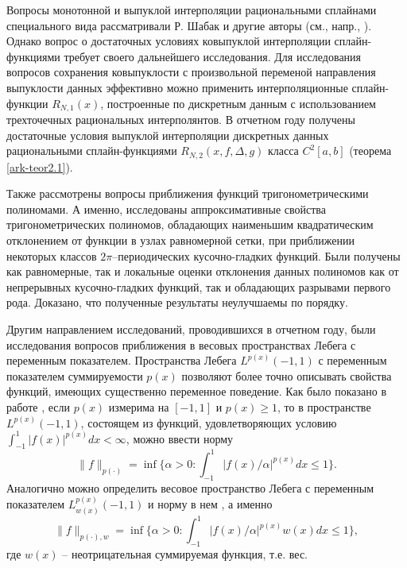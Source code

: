 Вопросы монотонной и выпуклой интерполяции рациональными сплайнами
специального вида рассматривали Р. Шабак \cite{ark-8} и другие авторы (см., напр.,
\cite{ark-9, ark-10, ark-11}).
%
Однако вопрос о достаточных условиях ковыпуклой интерполяции сплайн-функциями
требует своего дальнейшего исследования. Для исследования вопросов сохранения ковыпуклости
с произвольной переменой направления выпуклости данных эффективно можно применить
интерполяционные сплайн-функции $R_{N,1}(x)$, построенные по дискретным данным с
использованием трехточечных рациональных интерполянтов. В отчетном году получены достаточные условия выпуклой интерполяции дискретных данных рациональными
сплайн-функциями $R_{N,2}(x, f, \Delta, g)$ класса $C^2[a,b]$ (теорема \ref{ark-teor2.1}).

Также рассмотрены вопросы приближения функций тригонометрическими полиномами. А именно, исследованы аппроксимативные свойства тригонометрических полиномов, обладающих наименьшим квадратическим отклонением от функции в узлах равномерной сетки, при приближении некоторых классов $2\pi$--периодических кусочно-гладких функций. Были получены как равномерные, так и локальные оценки отклонения данных полиномов как от непрерывных кусочно-гладких функций,
так и обладающих разрывами первого рода. Доказано, что полученные результаты неулучшаемы по порядку.

Другим направлением исследований, проводившихся в отчетном году, были исследования вопросов приближения в весовых пространствах Лебега с переменным показателем. Пространства Лебега $L^{p(x)}(-1,1)$ с переменным показателем суммируемости $p(x)$ позволяют более точно описывать свойства функций, имеющих существенно переменное поведение. Как было показано в работе \cite{rffi-20}, если $p(x)$ измерима на $[-1,1]$ и $p(x)\geq1$, то в пространстве $L^{p(x)}(-1,1)$, состоящем из функций, удовлетворяющих условию $\int_{-1}^1|f(x)|^{p(x)}dx <\infty$, можно ввести норму
$$
\|f\|_{p(\cdot)}=\inf\{\alpha>0:\int_{-1}^1|f(x)/\alpha|^{p(x)}dx\le1\}.
$$
Аналогично можно определить весовое пространство Лебега с переменным показателем \linebreak $L^{p(x)}_{w(x)}(-1,1)$ и норму в нем \cite{rffi-26,rffi-27,rffi-28,rffi-29,rffi-30,rffi-31}, а именно
$$
\|f\|_{p(\cdot),w}=\inf\{\alpha>0:\int_{-1}^1|f(x)/\alpha|^{p(x)}w(x)dx\le1\},
$$
где $w(x)$ -- неотрицательная суммируемая функция, т.е. вес.


